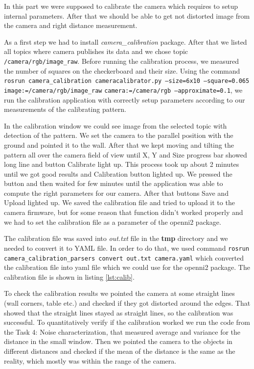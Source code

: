 \documentclass[11pt]{article}
\begin{document}
In this part we were supposed to calibrate the camera which requires to setup
internal parameters. After that we should be able to get not distorted image
from the camera and right distance measurement. \par

As a first step we had to install \emph{camera\_calibration} package. After that
we listed all topics where camera publishes its data and we chose topic
\texttt{/camera/rgb/image\_raw}. Before running the calibration process, we
measured the number of squares on the checkerboard and their size. Using the
command \texttt{rosrun camera\_calibration cameracalibrator.py --size=6x10
  --square=0.065 image:=/camera/rgb/image\_raw}{ } \texttt{camera:=/camera/rgb
  --approximate=0.1}, we run the calibration application with correctly setup
parameters according to our measurements of the calibrating pattern. \par

In the calibration window we could see image from the selected topic with
detection of the pattern. We set the camera to the parallel position with the
ground and pointed it to the wall. After that we kept moving and tilting the
pattern all over the camera field of view until X, Y and Size progress bar
showed long line and button Calibrate light up. This process took up about 2
minutes until we got good results and Calibration button lighted up. We pressed
the button and then waited for few minutes until the application was able to
compute the right parameters for our camera. After that buttons Save and Upload
lighted up. We saved the calibration file and tried to upload it to the camera
firmware, but for some reason that function didn't worked properly and we had to
set the calibration file as a parameter of the openni2 package. \par
        
The calibration file was saved into \emph{out.txt} file in the \textbf{tmp}
directory and we needed to convert it to YAML file. In order to do that, we used
command \texttt{rosrun camera\_calibration\_parsers convert out.txt camera.yaml}
which converted the calibration file into yaml file which we could use for the
openni2 package. The calibration file is shown in listing \vref{lst:calib}. \par
        
To check the calibration results we pointed the camera at some straight lines
(wall corners, table etc.) and checked if they got distorted around the
edges. That showed that the straight lines stayed as straight lines, so the
calibration was successful. To quantitatively verify if the calibration worked
we run the code from the Task 4: Noise characterization, that measured average
and variance for the distance in the small window. Then we pointed the camera to
the objects in different distances and checked if the mean of the distance is
the same as the reality, which mostly was within the range of the camera. \par
	
\end{document}
